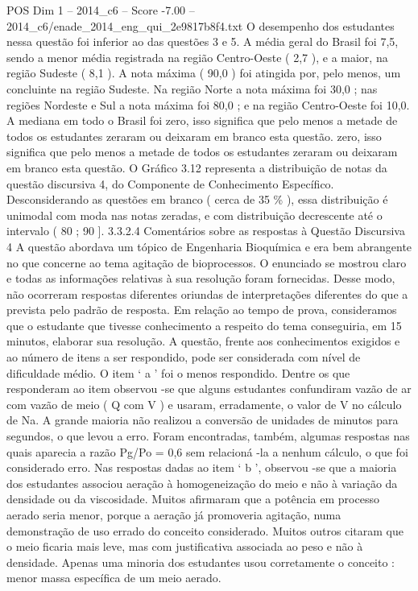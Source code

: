 \begin{textsample}{POS Dim 1 – 2014\_c6 – Score -7.00 – 2014\_c6/enade\_2014\_eng\_qui\_2e9817b8f4.txt}
O desempenho dos estudantes nessa questão foi inferior ao das questões 3 e 5.
A média geral do Brasil foi 7,5, sendo a menor média registrada na região Centro-Oeste ( 2,7 ), e a maior, na região Sudeste ( 8,1 ).
A nota máxima ( 90,0 ) foi atingida por, pelo menos, um concluinte na região Sudeste.
Na região Norte a nota máxima foi 30,0 ; nas regiões Nordeste e Sul a nota máxima foi 80,0 ; e na região Centro-Oeste foi 10,0.
A mediana em todo o Brasil foi zero, isso significa que pelo menos a metade de todos os estudantes zeraram ou deixaram em branco esta questão. zero, isso significa que pelo menos a metade de todos os estudantes zeraram ou deixaram em branco esta questão.
O Gráfico 3.12 representa a distribuição de notas da questão discursiva 4, do Componente de Conhecimento Específico.
Desconsiderando as questões em branco ( cerca de 35 \% ), essa distribuição é unimodal com moda nas notas zeradas, e com distribuição decrescente até o intervalo ( 80 ; 90 ]. 3.3.2.4 Comentários sobre as respostas à Questão Discursiva 4 A questão abordava um tópico de Engenharia Bioquímica e era bem abrangente no que concerne ao tema agitação de bioprocessos.
O enunciado se mostrou claro e todas as informações relativas à sua resolução foram fornecidas.
Desse modo, não ocorreram respostas diferentes oriundas de interpretações diferentes do que a prevista pelo padrão de resposta.
Em relação ao tempo de prova, consideramos que o estudante que tivesse conhecimento a respeito do tema conseguiria, em 15 minutos, elaborar sua resolução.
A questão, frente aos conhecimentos exigidos e ao número de itens a ser respondido, pode ser considerada com nível de dificuldade médio.
O item ‘ a ’ foi o menos respondido.
Dentre os que responderam ao item observou -se que alguns estudantes confundiram vazão de ar com vazão de meio ( Q com V ) e usaram, erradamente, o valor de V no cálculo de Na.
A grande maioria não realizou a conversão de unidades de minutos para segundos, o que levou a erro.
Foram encontradas, também, algumas respostas nas quais aparecia a razão Pg/Po = 0,6 sem relacioná -la a nenhum cálculo, o que foi considerado erro.
Nas respostas dadas ao item ‘ b ’, observou -se que a maioria dos estudantes associou aeração à homogeneização do meio e não à variação da densidade ou da viscosidade.
Muitos afirmaram que a potência em processo aerado seria menor, porque a aeração já promoveria agitação, numa demonstração de uso errado do conceito considerado.
Muitos outros citaram que o meio ficaria mais leve, mas com justificativa associada ao peso e não à densidade.
Apenas uma minoria dos estudantes usou corretamente o conceito : menor massa específica de um meio aerado.

\end{textsample}

